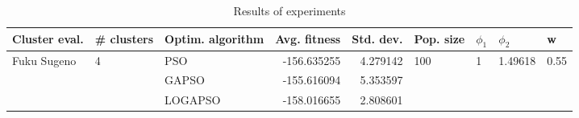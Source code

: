 \begin{table}
\centering
\caption{Results of experiments}
\begin{tabular}{lllrrllll}
\toprule
               Cluster eval. &        \# clusters & Optim. algorithm &  Avg. fitness &  Std. dev. &            Pop. size &         $\phi_{1}$ &               $\phi_{2}$ &                     w \\
\midrule
\multirow{3}{*}{Fuku Sugeno} & \multirow{3}{*}{4} &              PSO &   -156.635255 &   4.279142 & \multirow{3}{*}{100} & \multirow{3}{*}{1} & \multirow{3}{*}{1.49618} & \multirow{3}{*}{0.55} \\
                             &                    &            GAPSO &   -155.616094 &   5.353597 &                      &                    &                          &                       \\
                             &                    &          LOGAPSO &   -158.016655 &   2.808601 &                      &                    &                          &                       \\
\bottomrule
\end{tabular}
\end{table}
